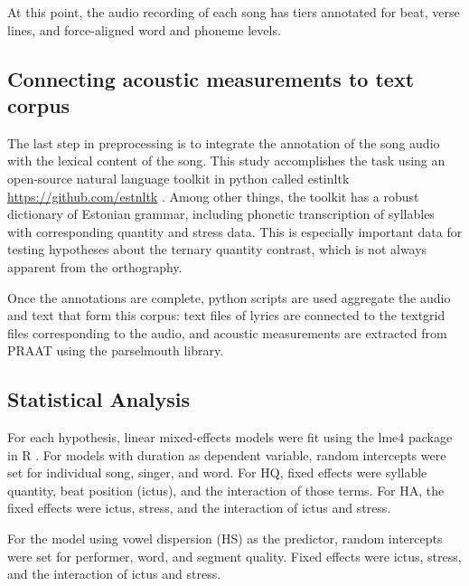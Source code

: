 At this point, the audio recording of each song has tiers annotated for beat, verse lines, and force-aligned word and phoneme levels.
\subsection{Connecting acoustic measurements to text corpus}

The last step in preprocessing is to integrate the annotation of the song audio with the lexical content of the song. This study accomplishes the task using an open-source natural language toolkit in python called estinltk \url{https://github.com/estnltk} \citep{estnltk2020}. Among other things, the toolkit has a robust dictionary of Estonian grammar, including phonetic transcription of syllables with corresponding quantity and stress data. This is especially important data for testing hypotheses about the ternary quantity contrast, which is not always apparent from the orthography. 



Once the annotations are complete, python scripts are used aggregate the audio and text that form this corpus: text files of lyrics are connected to the textgrid files corresponding to the audio, and acoustic measurements are extracted from PRAAT using the parselmouth library\citep{parselmouth2018, python1995}. 




\subsection{Statistical Analysis} 
For each hypothesis, linear mixed-effects models were fit using the lme4 package in R \citep{lme4,r2022}. For models with duration as dependent variable, random intercepts were set for individual song, singer, and word. For HQ, fixed effects were syllable quantity, beat position (ictus), and the interaction of those terms. For HA, the fixed effects were ictus, stress, and the interaction of ictus and stress. 

For the model using vowel dispersion (HS) as the predictor, random intercepts were set for performer, word, and segment quality. Fixed effects were ictus, stress, and the interaction of ictus and stress. 
